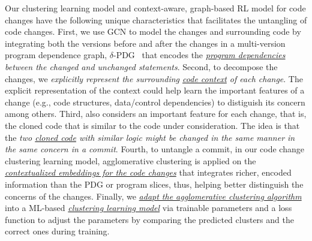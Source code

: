 Our clustering learning model and context-aware, graph-based RL model
for code changes have the following unique characteristics that
facilitates the untangling of code changes. First, we use GCN to model
the changes and surrounding code by integrating both the versions
before and after the changes in a multi-version program dependence
graph, $\delta$-PDG~\cite{flexeme-fse20} that encodes the {\em
  \underline{program dependencies} between the changed and unchanged
  statements}. Second, to decompose the changes, we {\em explicitly
  represent the surrounding \underline{code context} of each
  change}. The explicit representation of the context could help
{\tool} learn the important features of a change (e.g., code
structures, data/control dependencies) to distiguish its concern among
others. Third, {\tool} also considers an important feature for each
change, that is, the cloned code that is similar to the code under
consideration. The idea is that the {\em two \underline{cloned code}
  with similar logic might be changed in the same manner in the same
  concern in a commit}. Fourth, to untangle a commit, in our code
change clustering learning model, agglomerative clustering is applied
on the {\em \underline{contextualized embeddings for the code
    changes}} that integrates richer, encoded information than the PDG
or program slices, thus, helping better distinguish the concerns of
the changes. Finally, we {\em \underline{adapt the agglomerative
    clustering algorithm}} into a ML-based {\em \underline{clustering
    learning model}} via trainable parameters and a loss function to
  adjust the parameters by comparing the predicted clusters and the
  correct ones during training.



